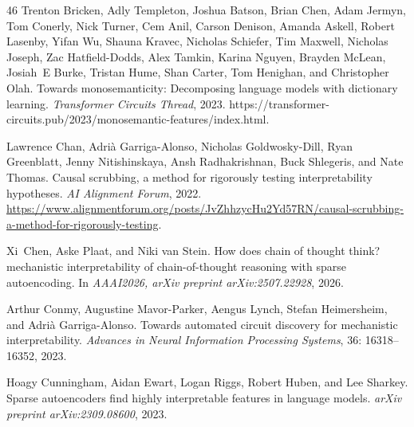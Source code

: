 \begin{thebibliography}{46}
Trenton Bricken, Adly Templeton, Joshua Batson, Brian Chen, Adam Jermyn, Tom Conerly, Nick Turner, Cem Anil, Carson Denison, Amanda Askell, Robert Lasenby, Yifan Wu, Shauna Kravec, Nicholas Schiefer, Tim Maxwell, Nicholas Joseph, Zac Hatfield-Dodds, Alex Tamkin, Karina Nguyen, Brayden McLean, Josiah~E Burke, Tristan Hume, Shan Carter, Tom Henighan, and Christopher Olah.
\newblock Towards monosemanticity: Decomposing language models with dictionary learning.
\newblock \emph{Transformer Circuits Thread}, 2023.
\newblock https://transformer-circuits.pub/2023/monosemantic-features/index.html.

Lawrence Chan, Adrià Garriga-Alonso, Nicholas Goldwosky-Dill, Ryan Greenblatt, Jenny Nitishinskaya, Ansh Radhakrishnan, Buck Shlegeris, and Nate Thomas.
\newblock Causal scrubbing, a method for rigorously testing interpretability hypotheses.
\newblock \emph{AI Alignment Forum}, 2022.
\newblock \url{https://www.alignmentforum.org/posts/JvZhhzycHu2Yd57RN/causal-scrubbing-a-method-for-rigorously-testing}.

Xi~Chen, Aske Plaat, and Niki van Stein.
\newblock How does chain of thought think? mechanistic interpretability of chain-of-thought reasoning with sparse autoencoding.
\newblock In \emph{AAAI2026, arXiv preprint arXiv:2507.22928}, 2026.

Arthur Conmy, Augustine Mavor-Parker, Aengus Lynch, Stefan Heimersheim, and Adri{\`a} Garriga-Alonso.
\newblock Towards automated circuit discovery for mechanistic interpretability.
\newblock \emph{Advances in Neural Information Processing Systems}, 36: 16318--16352, 2023.

Hoagy Cunningham, Aidan Ewart, Logan Riggs, Robert Huben, and Lee Sharkey.
\newblock Sparse autoencoders find highly interpretable features in language models.
\newblock \emph{arXiv preprint arXiv:2309.08600}, 2023.


\end{thebibliography}
